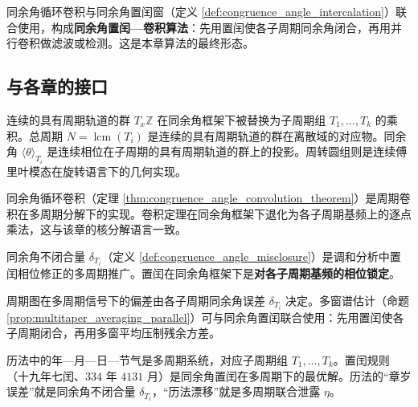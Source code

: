 \begin{remark}[与置闰窗的联合]\label{rem:congruence_convolution_intercalation}
同余角循环卷积与同余角置闰窗（定义 \ref{def:congruence_angle_intercalation}）联合使用，构成\textbf{同余角置闰—卷积算法}：先用置闰使各子周期同余角闭合，再用并行卷积做滤波或检测。这是本章算法的最终形态。
\end{remark}

\subsection{与各章的接口}

\begin{remark}\label{rem:interface_group_with_periodic_orbits_congruence}
连续的具有周期轨道的群 $T_x\mathbb{Z}$ 在同余角框架下被替换为子周期组 $T_1,\dots,T_k$ 的乘积。总周期 $N=\operatorname{lcm}(T_i)$ 是连续的具有周期轨道的群在离散域的对应物。同余角 $\langle\theta\rangle_{T_i}$ 是连续相位在子周期的具有周期轨道的群上的投影。周转圆组则是连续傅里叶模态在旋转语言下的几何实现。
\end{remark}

\begin{remark}\label{rem:interface_series_convolution_congruence}
同余角循环卷积（定理 \ref{thm:congruence_angle_convolution_theorem}）是周期卷积在多周期分解下的实现。卷积定理在同余角框架下退化为各子周期基频上的逐点乘法，这与该章的核分解语言一致。
\end{remark}

\begin{remark}\label{rem:interface_harmonic_congruence}
同余角不闭合量 $\delta_{T_i}$（定义 \ref{def:congruence_angle_misclosure}）是调和分析中置闰相位修正的多周期推广。置闰在同余角框架下是\textbf{对各子周期基频的相位锁定}。
\end{remark}

\begin{remark}\label{rem:interface_time_series_congruence}
周期图在多周期信号下的偏差由各子周期同余角误差 $\delta_{T_i}$ 决定。多窗谱估计（命题 \ref{prop:multitaper_averaging_parallel}）可与同余角置闰联合使用：先用置闰使各子周期闭合，再用多窗平均压制残余方差。
\end{remark}

\begin{remark}\label{rem:interface_calendar_congruence}
历法中的年—月—日—节气是多周期系统，对应子周期组 $T_1,\dots,T_k$。置闰规则（十九年七闰、$334$ 年 $4131$ 月）是同余角置闰在多周期下的最优解。历法的“章岁误差”就是同余角不闭合量 $\delta_{T_i}$，“历法漂移”就是多周期联合泄露 $\eta$。
\end{remark}


